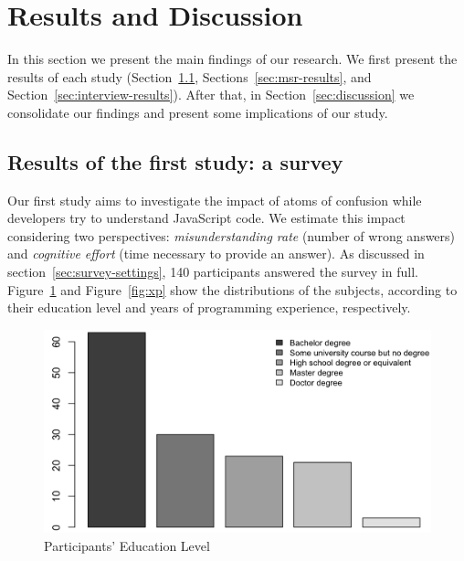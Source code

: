 \section{Results and Discussion}
\label{sec:results}

In this section we present the main findings of our research. We first present the results of each study (Section~\ref{sec:survey-resuts}, Sections~\ref{sec:msr-results}, and Section~\ref{sec:interview-results}). After that, in Section~\ref{sec:discussion} we consolidate our findings and present some implications of our study. 

\subsection{Results of the first study: a survey}
\label{sec:survey-resuts} 

Our first study aims to investigate the impact of atoms of confusion while developers try to understand JavaScript code. We estimate this impact considering two perspectives: \emph{misunderstanding rate} (number of wrong answers) and \emph{cognitive effort} (time necessary to provide an answer). As discussed in section~\ref{sec:survey-settings}, 140 participants answered the survey in full. Figure~\ref{fig:degree} and Figure~\ref{fig:xp} show the distributions of the subjects, according to their education level and years of programming experience, respectively.

\begin{figure}[htb]
      \centering
      \includegraphics[scale=.25]{images/degree.png}
      \caption{Participants' Education Level}\label{fig:degree}
  \end{figure}
  
